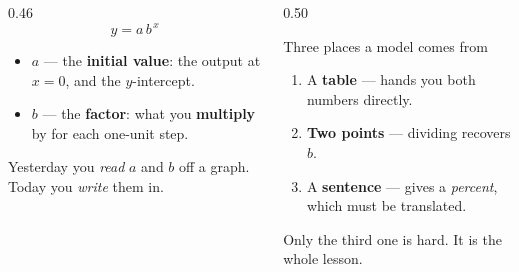 \documentclass[aspectratio=169, 11pt]{beamer}
\begin{document}
\begin{frame}[t, plain]
  \begin{columns}[T]
    \begin{column}{0.46\textwidth}
      \[ y = a\,b^{\,x} \]
      \begin{itemize}\setlength{\itemsep}{5pt}
        \item $a$ --- the \textbf{initial value}: the output at $x=0$, and the $y$-intercept.
        \item $b$ --- the \textbf{factor}: what you \textbf{multiply} by for each one-unit step.
      \end{itemize}
      \vspace{4pt}
      {\footnotesize Yesterday you \emph{read} $a$ and $b$ off a graph. Today you \emph{write} them in.}
    \end{column}
    \begin{column}{0.50\textwidth}
      \begin{block}{Three places a model comes from}
        \begin{enumerate}\setlength{\itemsep}{3pt}
          \item A \textbf{table} --- hands you both numbers directly.
          \item \textbf{Two points} --- dividing recovers $b$.
          \item A \textbf{sentence} --- gives a \emph{percent}, which must be translated.
        \end{enumerate}
      \end{block}
      \vspace{2pt}
      {\footnotesize Only the third one is hard. It is the whole lesson.}
    \end{column}
  \end{columns}
\end{frame}
\end{document}
